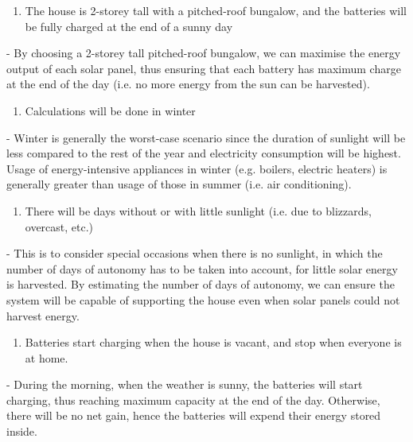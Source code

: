 \begin{enumerate}
    \item The house is 2-storey tall with a pitched-roof bungalow, and the batteries will be fully charged at the end of a sunny day
\end{enumerate}
- By choosing a 2-storey tall pitched-roof bungalow, we can maximise the energy output of each solar panel, thus ensuring that each battery has maximum charge at the end of the day (i.e. no more energy from the sun can be harvested). 
\begin{enumerate}[resume]
    \item Calculations will be done in winter
\end{enumerate}
- Winter is generally the worst-case scenario since the duration of sunlight will be less compared to the rest of the year and electricity consumption will be highest. Usage of energy-intensive appliances in winter (e.g. boilers, electric heaters) is generally greater than usage of those in summer (i.e. air conditioning).
\begin{enumerate}[resume]
    \item There will be days without or with little sunlight (i.e. due to blizzards, overcast, etc.)
\end{enumerate}
- This is to consider special occasions when there is no sunlight, in which the number of days of autonomy has to be taken into account, for little solar energy is harvested. By estimating the number of days of autonomy, we can ensure the system will be capable of supporting the house even when solar panels could not harvest energy.
\begin{enumerate}[resume]
    \item Batteries start charging when the house is vacant, and stop when everyone is at home.
\end{enumerate}
- During the morning, when the weather is sunny, the batteries will start charging, thus reaching maximum capacity at the end of the day. Otherwise, there will be no net gain, hence the batteries will expend their energy stored inside.
